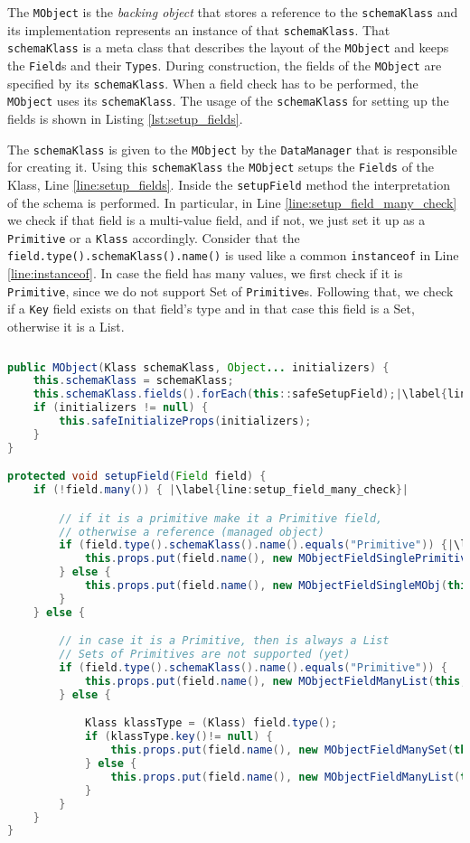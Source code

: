 The \texttt{MObject} is the \textit{backing object} that stores a reference to the \texttt{schemaKlass} and its implementation represents an instance of that \texttt{schemaKlass}.
That \texttt{schemaKlass} is a meta class that describes the layout of the \texttt{MObject} and keeps the \texttt{Field}s and their \texttt{Types}.
During construction, the fields of the \texttt{MObject} are specified by its \texttt{schemaKlass}.
When a field check has to be performed, the \texttt{MObject} uses its \texttt{schemaKlass}.
The usage of the \texttt{schemaKlass} for setting up the fields is shown in Listing \ref{lst:setup_fields}.

The \texttt{schemaKlass} is given to the \texttt{MObject} by the \texttt{DataManager} that is responsible for creating it.
Using this \texttt{schemaKlass} the \texttt{MObject} setups the \texttt{Fields} of the Klass, Line \ref{line:setup_fields}.
Inside the \texttt{setupField} method the interpretation of the schema is performed.
In particular, in Line \ref{line:setup_field_many_check} we check if that field is a multi-value field, and if not, we just set it up as a \texttt{Primitive} or a \texttt{Klass} accordingly. 
Consider that the \texttt{field.type().schemaKlass().name()} is used like a common \texttt{instanceof} in Line \ref{line:instanceof}.
In case the field has many values, we first check if it is \texttt{Primitive}, since we do not support Set of \texttt{Primitive}s.
Following that, we check if a \texttt{Key} field exists on that field's type and in that case this field is a Set, otherwise it is a List.

\begin{sourcecode}
	\begin{lstlisting}[language=Java, escapechar=|]
public MObject(Klass schemaKlass, Object... initializers) {
	this.schemaKlass = schemaKlass;
	this.schemaKlass.fields().forEach(this::safeSetupField);|\label{line:setup_fields}|
	if (initializers != null) {
		this.safeInitializeProps(initializers);
	}
}

protected void setupField(Field field) {
	if (!field.many()) { |\label{line:setup_field_many_check}|

		// if it is a primitive make it a Primitive field, 
		// otherwise a reference (managed object)
		if (field.type().schemaKlass().name().equals("Primitive")) {|\label{line:instanceof}|
			this.props.put(field.name(), new MObjectFieldSinglePrimitive(this, field));
		} else {
			this.props.put(field.name(), new MObjectFieldSingleMObj(this, field));
		}
	} else {

		// in case it is a Primitive, then is always a List
		// Sets of Primitives are not supported (yet)
		if (field.type().schemaKlass().name().equals("Primitive")) {
			this.props.put(field.name(), new MObjectFieldManyList(this, field));
		} else {

			Klass klassType = (Klass) field.type();
			if (klassType.key()!= null) {
				this.props.put(field.name(), new MObjectFieldManySet(this, field));
			} else {
				this.props.put(field.name(), new MObjectFieldManyList(this, field));
			}
		}
	}
}
	\end{lstlisting}
	\caption{MObject: setup fields}
	\label{lst:setup_fields}
\end{sourcecode}


